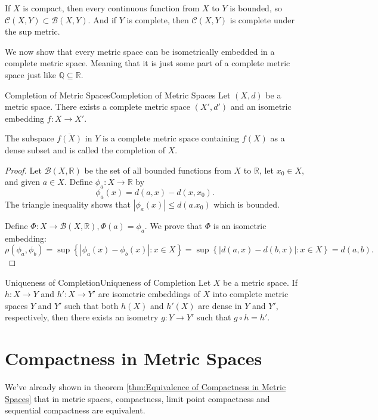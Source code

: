 \documentclass[../main.tex]{subfiles}
\begin{document}
If $X$ is compact, then every continuous function from $X$ to $Y$ is bounded, so $\mathscr{C}(X,Y) \subset \mathscr{B}(X,Y)$. And if $Y$ is complete, then $\mathscr{C}(X,Y)$ is complete under the sup metric.

We now show that every metric space can be isometrically embedded in a complete metric space. Meaning that it is just some part of a complete metric space just like $\mathbb{Q} \subseteq \mathbb{R}$.

\begin{theorem}{Completion of Metric Spaces}{Completion of Metric Spaces}
	Let $(X,d)$ be a metric space. There exists a complete metric space $(X',d')$ and an isometric embedding $f : X \to X'$.

	The subspace $\overline{f(X)}$ in $Y$ is a complete metric space containing $f(X)$ as a dense subset and is called the completion of $X$.
\end{theorem}
\begin{proof}
	Let $\mathscr{B}(X,\mathbb{R})$ be the set of all bounded functions from $X$ to $\mathbb{R}$, let $x_0\in X$, and given $a\in X$. Define $\phi_a:X \rightarrow \mathbb{R}$ by
	\begin{equation*}
		\phi_a(x) = d(a,x) - d(x,x_0).
	\end{equation*}
	The triangle inequality shows that $\left|\phi_a(x)\right| \leq d(a.x_0)$ which is bounded.

	Define $\Phi: X \rightarrow \mathscr{B}(X,\mathbb{R}), \Phi(a) = \phi_a$. We prove that $\Phi$ is an isometric embedding:
	\begin{equation*}
		\rho(\phi_a,\phi_b) = \sup \left\{|\phi_a(x) - \phi_b(x)| : x \in X \right\} = \sup \left\{|d(a,x) - d(b,x)| : x \in X \right\} = d(a,b).
	\end{equation*}
\end{proof}

\begin{theorem}{Uniqueness of Completion}{Uniqueness of Completion}
	Let $X$ be a metric space. If $h:X \rightarrow Y$ and $h':X \rightarrow Y'$ are isometric embeddings of $X$ into complete metric spaces $Y$ and $Y'$ such that both $h(X)$ and $h'(X)$ are dense in $Y$ and $Y'$, respectively, then there exists an isometry $g:Y \rightarrow Y'$ such that $g \circ h = h'$.
\end{theorem}

\section{Compactness in Metric Spaces}
We've already shown in theorem \ref{thm:Equivalence of Compactness in Metric Spaces} that in metric spaces, compactness, limit point compactness and sequential compactness are equivalent.
\end{document}
